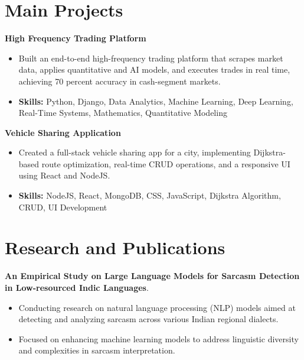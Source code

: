 \documentclass[a4paper,11pt]{article}
\begin{document}
\section{\textbf{Main Projects}}

\vspace{1mm}
  \textbf{High Frequency Trading Platform  }
\vspace{-1.5mm} %
\begin{itemize}
  \item Built an end-to-end high-frequency trading platform that scrapes market data, applies quantitative and AI models, and executes trades in real time, achieving 70 percent accuracy in cash-segment markets.
\vspace{-3mm}
  \item \textbf{Skills:} Python, Django, Data Analytics, Machine Learning, Deep Learning, Real-Time Systems, Mathematics, Quantitative Modeling
\end{itemize}


\vspace{1mm}
   \textbf{Vehicle Sharing Application }
\vspace{-1.5mm} %
\begin{itemize}
  \item Created a full-stack vehicle sharing app for a city, implementing Dijkstra-based route optimization, real-time CRUD operations, and a responsive UI using React and NodeJS.
\vspace{-3mm}
  \item \textbf{Skills:} NodeJS, React, MongoDB, CSS, JavaScript, Dijkstra Algorithm, CRUD, UI Development
\end{itemize}



\section{\textbf{Research and Publications} \hfill }
\vspace{1mm}
  \textbf{An Empirical Study on Large Language Models for Sarcasm Detection in Low-resourced Indic Languages}.
\vspace{-1mm} %
\begin{itemize}
  \item Conducting research on natural language processing (NLP) models aimed at detecting and analyzing sarcasm across various Indian regional dialects.
\vspace{-3mm}
  \item Focused on enhancing machine learning models to address linguistic diversity and complexities in sarcasm interpretation.
\end{itemize}
\end{document}

